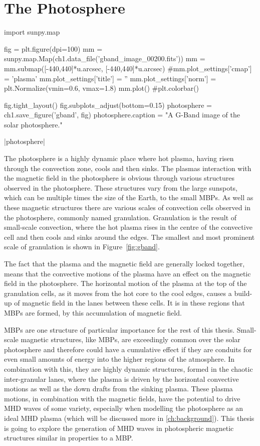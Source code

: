 \section{The Photosphere} 

\begin{pycode}[chapter1]
import sunpy.map

fig = plt.figure(dpi=100)
mm = sunpy.map.Map(ch1.data_file('gband_image_00200.fits'))
mm = mm.submap([-440,440]*u.arcsec, [-440,440]*u.arcsec)
#mm.plot_settings['cmap'] = 'plasma'
mm.plot_settings['title'] = ''
mm.plot_settings['norm'] = plt.Normalize(vmin=0.6, vmax=1.8)
mm.plot()
#plt.colorbar()

fig.tight_layout()
fig.subplots_adjust(bottom=0.15)
photosphere = ch1.save_figure('gband', fig)
photosphere.caption = "A G-Band image of the solar photosphere."
\end{pycode}

\py[chapter1]|photosphere|

The photosphere is a highly dynamic place where hot plasma, having risen through the convection zone, cools and then sinks.
The plasmas interaction with the magnetic field in the photosphere is obvious through various structures observed in the photosphere.
These structures vary from the large sunspots, which can be multiple times the size of the Earth, to the small MBPs. %
As well as these magnetic structures there are various scales of convection cells observed in the photosphere, commonly named granulation.
Granulation is the result of small-scale convection, where the hot plasma rises in the centre of the convective cell and then cools and sinks around the edges.
The smallest and most prominent scale of granulation is shown in Figure~\ref{fig:gband}.

The fact that the plasma and the magnetic field are generally locked together, means that the convective motions of the plasma have an effect on the magnetic field in the photosphere.
The horizontal motion of the plasma at the top of the granulation cells, as it moves from the hot core to the cool edges, causes a build-up of magnetic field in the lanes between these cells.
It is in these regions that MBPs are formed, by this accumulation of magnetic field. \citep{shelyag2004,keys2013}

MBPs are one structure of particular importance for the rest of this thesis.
Small-scale magnetic structures, like MBPs, are exceedingly common over the solar photosphere and therefore could have a cumulative effect if they are conduits for even small amounts of energy into the higher regions of the atmosphere.
In combination with this, they are highly dynamic structures, formed in the chaotic inter-granular lanes, where the plasma is driven by the horizontal convective motions as well as the down drafts from the sinking plasma.
These plasma motions, in combination with the magnetic fields, have the potential to drive MHD waves of some variety, especially when modelling the photosphere as an ideal MHD plasma (which will be discussed more in \cref{ch:background}).
This thesis is going to explore the generation of MHD waves in photospheric magnetic structures similar in properties to a MBP.

